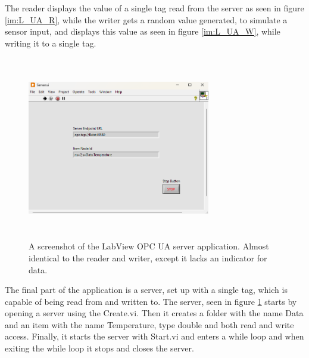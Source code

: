 \documentclass[11pt, A4paper, english]{article}
\begin{document}
The reader displays the value of a single tag read from the server as seen in figure \ref{im:L_UA_R}, while the writer gets a random value generated, to simulate a sensor input, and displays this value as seen in figure \ref{im:L_UA_W}, while writing it to a single tag. 
				\begin{figure}
\includegraphics[width=8cm, height=8cm]{Labview OPC UA/Server/Server_Screenshot.png}
\caption{A screenshot of the LabView OPC UA server application. Almost identical to the reader and writer, except it lacks an indicator for data.}
\label{im:L_UA_S}
				\end{figure}
The final part of the application is a server, set up with a single tag, which is capable of being read from and written to. The server, seen in figure \ref{im:L_UA_S} starts by opening a server using the Create.vi. Then it creates a folder with the name Data and an item with the name Temperature, type double and both read and write access. Finally, it starts the server with Start.vi and enters a while loop and when exiting the while loop it stops and closes the server.
			
\end{document}
